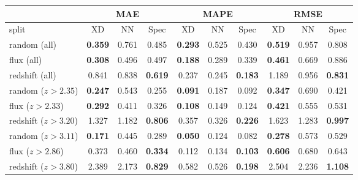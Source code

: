 
\begin{tabular}{ p{2.9cm}|ccc|ccc|ccc}
 & \multicolumn{3}{c}{MAE} & \multicolumn{3}{c}{MAPE} & \multicolumn{3}{c}{RMSE} \\
 \hline
 split & XD & NN & Spec & XD & NN & Spec & XD & NN & Spec \\
 \hline
 random (all) & \textbf{0.359} & 0.761 & 0.485 & \textbf{0.293} & 0.525 & 0.430 & \textbf{0.519} & 0.957 & 0.808  \\
 flux (all) & \textbf{0.308} & 0.496 & 0.497 & \textbf{0.188} & 0.289 & 0.339 & \textbf{0.461} & 0.669 & 0.886  \\
 redshift (all) & 0.841 & 0.838 & \textbf{0.619} & 0.237 & 0.245 & \textbf{0.183} & 1.189 & 0.956 & \textbf{0.831}  \\
 \hline
 random ($z > 2.35$) & \textbf{0.247} & 0.543 & 0.255 & \textbf{0.091} & 0.187 & 0.092 & \textbf{0.347} & 0.690 & 0.421  \\
 flux ($z > 2.33$) & \textbf{0.292} & 0.411 & 0.326 & \textbf{0.108} & 0.149 & 0.124 & \textbf{0.421} & 0.555 & 0.531  \\
 redshift ($z > 3.20$) & 1.327 & 1.182 & \textbf{0.806} & 0.357 & 0.326 & \textbf{0.226} & 1.623 & 1.283 & \textbf{0.997}  \\
 \hline
 random ($z > 3.11$) & \textbf{0.171} & 0.445 & 0.289 & \textbf{0.050} & 0.124 & 0.082 & \textbf{0.278} & 0.573 & 0.529  \\
 flux ($z > 2.86$) & 0.373 & 0.460 & \textbf{0.334} & 0.112 & 0.134 & \textbf{0.103} & \textbf{0.606} & 0.680 & 0.643  \\
 redshift ($z > 3.80$) & 2.389 & 2.173 & \textbf{0.829} & 0.582 & 0.526 & \textbf{0.198} & 2.504 & 2.236 & \textbf{1.108}  \\
 \hline
\end{tabular}

